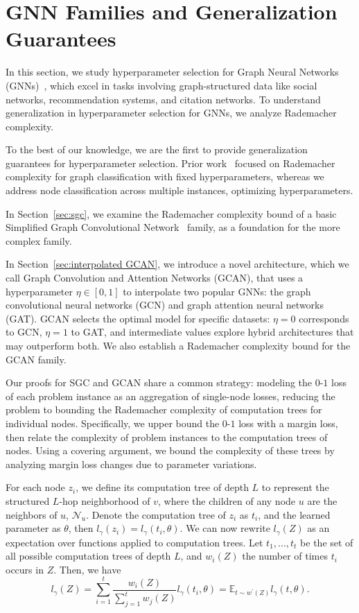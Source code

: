 \section{GNN Families and  Generalization Guarantees}\label{sec:gcn}
In this section, we study hyperparameter selection for Graph Neural Networks (GNNs)~\citep{kipf2016semi,velivckovic2017graph,iscen2019label}, which excel in tasks involving graph-structured data like social networks, recommendation systems, and citation networks. To understand generalization in hyperparameter selection for GNNs, we analyze Rademacher complexity. 

To the best of our knowledge, we are the first to provide generalization guarantees for hyperparameter selection. Prior work~\citep{garg2020generaliz} focused on Rademacher complexity for graph classification with fixed hyperparameters, whereas we address node classification across multiple instances, optimizing hyperparameters.

In Section~\ref{sec:sgc}, we examine the Rademacher complexity bound of a basic Simplified Graph Convolutional Network~\citep{wu19simplifying} family, as a foundation for the more complex family. 

In Section~\ref{sec:interpolated GCAN}, we introduce a novel architecture, which we call Graph Convolution and Attention Networks (GCAN), that uses a hyperparameter $\eta \in [0,1]$ to interpolate two popular GNNs: the graph convolutional neural networks (GCN) and graph attention neural networks (GAT). GCAN selects the optimal model for specific datasets: $\eta = 0$ corresponds to GCN, $\eta = 1$ to GAT, and intermediate values explore hybrid architectures that may outperform both. We also establish a Rademacher complexity bound for the GCAN family.

Our proofs for SGC and GCAN share a common strategy: modeling the $0$-$1$ loss of each problem instance as an aggregation of single-node losses, reducing the problem to bounding the Rademacher complexity of computation trees for individual nodes. Specifically, we upper bound the $0$-$1$ loss with a margin loss, then relate the complexity of problem instances to the computation trees of nodes. Using a covering argument, we bound the complexity of these trees by analyzing margin loss changes due to parameter variations.

For each node $z_i$, we define its computation tree of depth $L$ to represent the structured $L$-hop neighborhood of $v$, where the children of any node $u$ are the neighbors of $u$, $\mathcal{N}_u$. Denote the computation tree of $z_i$ as $t_i$, and the learned parameter as $\theta$, then $l_\gamma(z_i) = l_\gamma(t_i, \theta)$. 
%
We can now rewrite $l_\gamma(Z)$ as an expectation over functions applied to computation trees. Let $t_1, ..., t_t$ be the set of all possible computation trees of depth $L$, and $w_i(Z)$ the number of times $t_i$ occurs in $Z$. Then, we have
\[l_\gamma(Z) = \sum_{i=1}^t \frac{w_i(Z)}{\sum_{j=1}^t w_j(Z)} l_\gamma(t_i, \theta) = \mathbb{E}_{t\sim w^\prime(Z)} l_\gamma(t,\theta).\]

